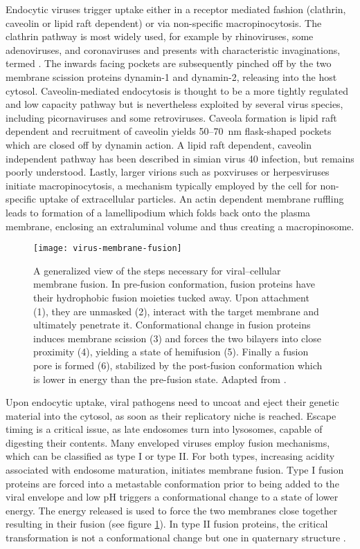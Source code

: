 Endocytic viruses trigger uptake either in a receptor mediated fashion (clathrin, caveolin or lipid raft dependent) or via non-specific macropinocytosis. The clathrin pathway is most widely used, for example by rhinoviruses, some adenoviruses, and coronaviruses and presents with characteristic invaginations, termed . The inwards facing pockets are subsequently pinched off by the two membrane scission proteins dynamin-1 and dynamin-2, releasing  into the host cytosol. Caveolin-mediated endocytosis is thought to be a more tightly regulated and low capacity pathway but is nevertheless exploited by several virus species, including picornaviruses and some retroviruses. Caveola formation is lipid raft dependent and recruitment of caveolin yields 50--\SI{70}{\nano\meter} flask-shaped pockets which are closed off by dynamin action. A lipid raft dependent, caveolin independent pathway has been described in simian virus 40 infection, but remains poorly understood. Lastly, larger virions such as poxviruses or herpesviruses initiate macropinocytosis, a mechanism typically employed by the cell for non-specific uptake of extracellular particles. An actin dependent membrane ruffling leads to formation of a lamellipodium which folds back onto the plasma membrane, enclosing an extraluminal volume and thus creating a macropinosome.

\begin{figure}
  \centering
  \texttt{[image: virus-membrane-fusion]}
  \caption[A generalized view of the steps necessary for viral--cellular membrane fusion.]{A generalized view of the steps necessary for viral--cellular membrane fusion. In pre-fusion conformation, fusion proteins have their hydrophobic fusion moieties tucked away. Upon attachment (1), they are unmasked (2), interact with the target membrane and ultimately penetrate it. Conformational change in fusion proteins induces membrane scission (3) and forces the two bilayers into close proximity (4), yielding a state of hemifusion (5). Finally a fusion pore is formed (6), stabilized by the post-fusion conformation which is lower in energy than the pre-fusion state. Adapted from \citet{Hulo2011}.}
  \label{fig:virus-membrane-fusion}
\end{figure}

Upon endocytic uptake, viral pathogens need to uncoat and eject their genetic material into the cytosol, as soon as their replicatory niche is reached. Escape timing is a critical issue, as late endosomes turn into lysosomes, capable of digesting their contents. Many enveloped viruses employ fusion mechanisms, which can be classified as type I or type II. For both types, increasing acidity associated with endosome maturation, initiates membrane fusion. Type I fusion proteins are forced into a metastable conformation prior to being added to the viral envelope and low pH triggers a conformational change to a state of lower energy. The energy released is used to force the two membranes close together resulting in their fusion (see figure \ref{fig:virus-membrane-fusion}). In type II fusion proteins, the critical transformation is not a conformational change but one in quaternary structure \citep{Harrison2008}.

